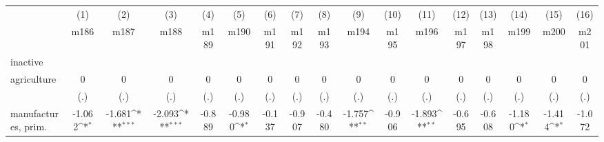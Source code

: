 {
\def\sym#1{\ifmmode^{#1}\else\(^{#1}\)\fi}
\begin{tabular}{l*{16}{c}}
\hline\hline
                    &\multicolumn{1}{c}{(1)}&\multicolumn{1}{c}{(2)}&\multicolumn{1}{c}{(3)}&\multicolumn{1}{c}{(4)}&\multicolumn{1}{c}{(5)}&\multicolumn{1}{c}{(6)}&\multicolumn{1}{c}{(7)}&\multicolumn{1}{c}{(8)}&\multicolumn{1}{c}{(9)}&\multicolumn{1}{c}{(10)}&\multicolumn{1}{c}{(11)}&\multicolumn{1}{c}{(12)}&\multicolumn{1}{c}{(13)}&\multicolumn{1}{c}{(14)}&\multicolumn{1}{c}{(15)}&\multicolumn{1}{c}{(16)}\\
                    &\multicolumn{1}{c}{m186}&\multicolumn{1}{c}{m187}&\multicolumn{1}{c}{m188}&\multicolumn{1}{c}{m189}&\multicolumn{1}{c}{m190}&\multicolumn{1}{c}{m191}&\multicolumn{1}{c}{m192}&\multicolumn{1}{c}{m193}&\multicolumn{1}{c}{m194}&\multicolumn{1}{c}{m195}&\multicolumn{1}{c}{m196}&\multicolumn{1}{c}{m197}&\multicolumn{1}{c}{m198}&\multicolumn{1}{c}{m199}&\multicolumn{1}{c}{m200}&\multicolumn{1}{c}{m201}\\
\hline
inactive            &                     &                     &                     &                     &                     &                     &                     &                     &                     &                     &                     &                     &                     &                     &                     &                     \\
agriculture         &           0         &           0         &           0         &           0         &           0         &           0         &           0         &           0         &           0         &           0         &           0         &           0         &           0         &           0         &           0         &           0         \\
                    &         (.)         &         (.)         &         (.)         &         (.)         &         (.)         &         (.)         &         (.)         &         (.)         &         (.)         &         (.)         &         (.)         &         (.)         &         (.)         &         (.)         &         (.)         &         (.)         \\
[1em]
manufactures, prim. &      -1.062\sym{*}  &      -1.681\sym{***}&      -2.093\sym{***}&      -0.889         &      -0.980\sym{*}  &      -0.137         &      -0.907         &      -0.480         &      -1.757\sym{**} &      -0.906         &      -1.893\sym{**} &      -0.695         &      -0.608         &      -1.180\sym{*}  &      -1.414\sym{*}  &      -1.072         \\

\end{tabular}}
